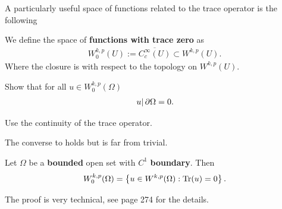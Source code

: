 \documentclass[
    a4paper,
    DIV=14,
    abstract=true,
    numbers=noenddot
]{scrartcl}
\begin{document}
A particularly useful space of functions related to the trace operator is the following
\begin{definition}
	We define the space of \textbf{functions with trace zero} as
	\begin{align*}
		W^{k,p}_0(U):=\overline{C_c^\infty(U)}\subset W^{k,p}(U).
	\end{align*}
	Where the closure is with respect to the topology on $W^{k,p}(U)$.
\end{definition}
\begin{exercise}\label{trace 0}
	Show that for all $u \in W^{k,p}_0(\Omega)$
	\begin{align*}
		\left.u\right|{\partial \Omega}=0.
	\end{align*}
\end{exercise}
\begin{hint}
	Use the continuity of the trace operator.
\end{hint}
The converse to  holds but is far from trivial.
\begin{proposition}
	Let $\Omega$ be a \textbf{bounded} open set with $C^1$  \textbf{boundary}. Then
	\begin{align*}
		W^{k,p}_0(\Omega)=\left\{u \in W^{k,p}(\Omega): \operatorname{Tr}(u)=0\right\} .
	\end{align*}
\end{proposition}
The proof is very technical, see \cite{evans2022partial} page 274 for the details.\\
\end{document}

